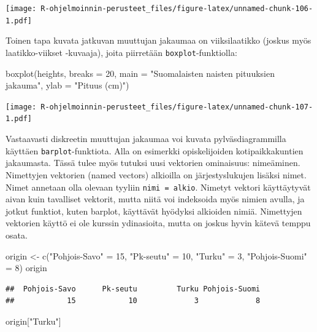 \documentclass[
]{book}
\newenvironment{Shaded}{\begin{snugshade}}{\end{snugshade}}
\newcommand{\AttributeTok}[1]{\textcolor[rgb]{0.77,0.63,0.00}{#1}}
\newcommand{\DecValTok}[1]{\textcolor[rgb]{0.00,0.00,0.81}{#1}}
\newcommand{\FunctionTok}[1]{\textcolor[rgb]{0.00,0.00,0.00}{#1}}
\newcommand{\NormalTok}[1]{#1}
\newcommand{\OtherTok}[1]{\textcolor[rgb]{0.56,0.35,0.01}{#1}}
\newcommand{\StringTok}[1]{\textcolor[rgb]{0.31,0.60,0.02}{#1}}
\begin{document}
\texttt{[image: R-ohjelmoinnin-perusteet\_files/figure-latex/unnamed-chunk-106-1.pdf]}

Toinen tapa kuvata jatkuvan muuttujan jakaumaa on viiksilaatikko (joskus myös laatikko-viikset -kuvaaja), joita piirretään \texttt{boxplot}-funktiolla:

\begin{Shaded}
\begin{Highlighting}[]
\FunctionTok{boxplot}\NormalTok{(heights, }\AttributeTok{breaks =} \DecValTok{20}\NormalTok{, }
     \AttributeTok{main =} \StringTok{"Suomalaisten naisten pituuksien jakauma"}\NormalTok{,}
     \AttributeTok{ylab =} \StringTok{"Pituus (cm)"}\NormalTok{)}
\end{Highlighting}
\end{Shaded}

\texttt{[image: R-ohjelmoinnin-perusteet\_files/figure-latex/unnamed-chunk-107-1.pdf]}

Vastaavasti diskreetin muuttujan jakaumaa voi kuvata pylväsdiagrammilla käyttäen \texttt{barplot}-funktiota. Alla on esimerkki opiskelijoiden kotipaikkakuntien jakaumasta. Tässä tulee myös tutuksi uusi vektorien ominaisuus: nimeäminen. Nimettyjen vektorien (named vectors) alkioilla on järjestyslukujen lisäksi nimet. Nimet annetaan olla olevaan tyyliin \texttt{nimi\ =\ alkio}. Nimetyt vektori käyttäytyvät aivan kuin tavalliset vektorit, mutta niitä voi indeksoida myös nimien avulla, ja jotkut funktiot, kuten barplot, käyttävät hyödyksi alkioiden nimiä. Nimettyjen vektorien käyttö ei ole kurssin ydinasioita, mutta on joskus hyvin kätevä temppu osata.

\begin{Shaded}
\begin{Highlighting}[]
\NormalTok{origin }\OtherTok{\textless{}{-}} \FunctionTok{c}\NormalTok{(}\StringTok{"Pohjois{-}Savo"} \OtherTok{=} \DecValTok{15}\NormalTok{, }\StringTok{"Pk{-}seutu"} \OtherTok{=} \DecValTok{10}\NormalTok{, }\StringTok{"Turku"} \OtherTok{=} \DecValTok{3}\NormalTok{,}
            \StringTok{"Pohjois{-}Suomi"} \OtherTok{=} \DecValTok{8}\NormalTok{)}
\NormalTok{origin}
\end{Highlighting}
\end{Shaded}

\begin{verbatim}
##  Pohjois-Savo      Pk-seutu         Turku Pohjois-Suomi 
##            15            10             3             8
\end{verbatim}

\begin{Shaded}
\begin{Highlighting}[]
\NormalTok{origin[}\StringTok{"Turku"}\NormalTok{]}
\end{Highlighting}
\end{Shaded}
\end{document}
